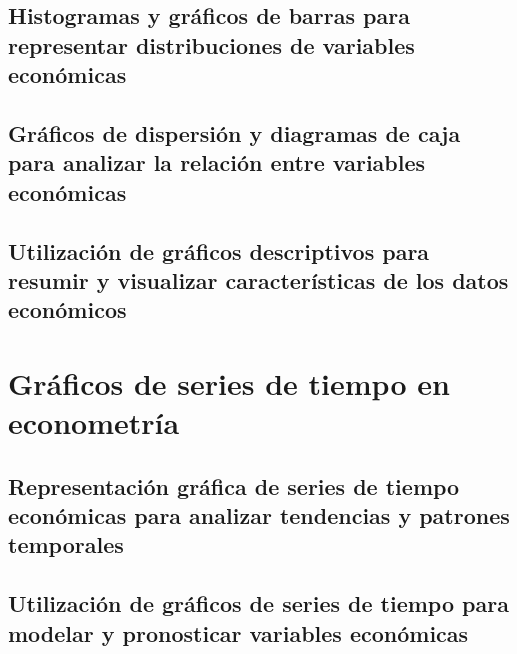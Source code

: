\documentclass[
  a4paper,
]{article}
\begin{document}
\hypertarget{histogramas-y-gruxe1ficos-de-barras-para-representar-distribuciones-de-variables-econuxf3micas}{%
\subsection{Histogramas y gráficos de barras para representar
distribuciones de variables
económicas}\label{histogramas-y-gruxe1ficos-de-barras-para-representar-distribuciones-de-variables-econuxf3micas}}

\hypertarget{gruxe1ficos-de-dispersiuxf3n-y-diagramas-de-caja-para-analizar-la-relaciuxf3n-entre-variables-econuxf3micas}{%
\subsection{Gráficos de dispersión y diagramas de caja para analizar la
relación entre variables
económicas}\label{gruxe1ficos-de-dispersiuxf3n-y-diagramas-de-caja-para-analizar-la-relaciuxf3n-entre-variables-econuxf3micas}}

\hypertarget{utilizaciuxf3n-de-gruxe1ficos-descriptivos-para-resumir-y-visualizar-caracteruxedsticas-de-los-datos-econuxf3micos}{%
\subsection{Utilización de gráficos descriptivos para resumir y
visualizar características de los datos
económicos}\label{utilizaciuxf3n-de-gruxe1ficos-descriptivos-para-resumir-y-visualizar-caracteruxedsticas-de-los-datos-econuxf3micos}}

\hypertarget{gruxe1ficos-de-series-de-tiempo-en-econometruxeda}{%
\section{Gráficos de series de tiempo en
econometría}\label{gruxe1ficos-de-series-de-tiempo-en-econometruxeda}}

\hypertarget{representaciuxf3n-gruxe1fica-de-series-de-tiempo-econuxf3micas-para-analizar-tendencias-y-patrones-temporales}{%
\subsection{Representación gráfica de series de tiempo económicas para
analizar tendencias y patrones
temporales}\label{representaciuxf3n-gruxe1fica-de-series-de-tiempo-econuxf3micas-para-analizar-tendencias-y-patrones-temporales}}

\hypertarget{utilizaciuxf3n-de-gruxe1ficos-de-series-de-tiempo-para-modelar-y-pronosticar-variables-econuxf3micas}{%
\subsection{Utilización de gráficos de series de tiempo para modelar y
pronosticar variables
económicas}\label{utilizaciuxf3n-de-gruxe1ficos-de-series-de-tiempo-para-modelar-y-pronosticar-variables-econuxf3micas}}
\end{document}
